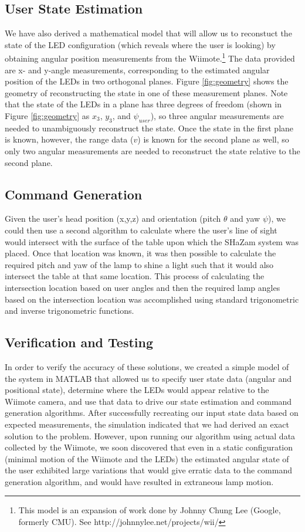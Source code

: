 \documentclass[conference, twocolumn]{IEEEtran}
\begin{document}
\subsection{User State Estimation}
We have also derived a mathematical model that will allow us to reconstuct the state of the LED configuration (which reveals where the user is looking) by obtaining angular position measurements from the Wiimote.\footnote{This model is an expansion of work done by Johnny Chung Lee (Google, formerly CMU). See http://johnnylee.net/projects/wii/} The data provided are x- and y-angle measurements, corresponding to the estimated angular position of the LEDs in two orthogonal planes. Figure \ref{fig:geometry} shows the geometry of reconstructing the state in one of these measurement planes. Note that the state of the LEDs in a plane has three degrees of freedom (shown in Figure \ref{fig:geometry} as $x_{3}$, $y_{3}$, and $\psi_{user}$), so three angular measurements are needed to unambiguously reconstruct the state. Once the state in the first plane is known, however, the range data ($v$) is known for the second plane as well, so only two angular measurements are needed to reconstruct the state relative to the second plane. 

\subsection{Command Generation}
Given the user's head position (x,y,z) and orientation (pitch $\theta$ and yaw $\psi$), we could then use a second algorithm to calculate where the user's line of sight would intersect with the surface of the table upon which the SHaZam system was placed. Once that location was known, it was then possible to calculate the required pitch and yaw of the lamp to shine a light such that it would also intersect the table at that same location. This process of calculating the intersection location based on user angles and then the required lamp angles based on the intersection location was accomplished using standard trigonometric and inverse trigonometric functions.

\subsection{Verification and Testing}
In order to verify the accuracy of these solutions, we created a simple model of the system in MATLAB that allowed us to specify user state data (angular and positional state), determine where the LEDs would appear relative to the Wiimote camera, and use that data to drive our state estimation and command generation algorithms. After successfully recreating our input state data based on expected measurements, the simulation indicated that we had derived an exact solution to the problem. However, upon running our algorithm using actual data collected by the Wiimote, we soon discovered that even in a static configuration (minimal motion of the Wiimote and the LEDs) the estimated angular state of the user exhibited large variations that would give erratic data to the command generation algorithm, and would have resulted in extraneous lamp motion.
\end{document}
